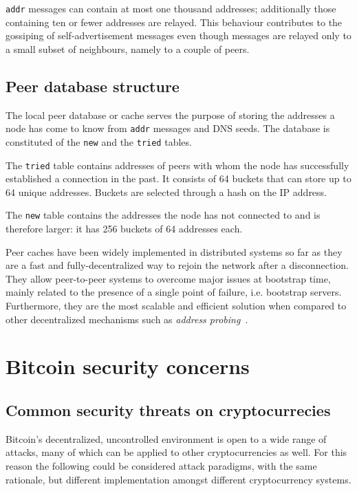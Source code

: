 \documentclass[12pt, letterpaper, twoside]{article}
\begin{document}
 \texttt{addr} messages can contain at most one thousand addresses; additionally those containing ten or fewer addresses are relayed. This behaviour contributes to the gossiping of self-advertisement messages even though messages are relayed only to a small subset of neighbours, namely to a couple of peers.

\subsection{Peer database structure}\label{sec:cachestruct}
The local peer database or cache serves the purpose of storing the addresses a node has come to know from \texttt{addr} messages and DNS seeds. The database is constituted of the \texttt{new} and the \texttt{tried} tables.

The \texttt{tried} table contains addresses of peers with whom the node has successfully established a connection in the past. It consists of 64 buckets that can store up to 64 unique addresses. Buckets are selected through a hash on the IP address.

The \texttt{new} table contains the addresses the node has not connected to and is therefore larger: it has 256 buckets of 64 addresses each.

Peer caches have been widely implemented in distributed systems so far as they are a fast and fully-decentralized way to rejoin the network after a disconnection. They allow peer-to-peer systems to overcome major issues at bootstrap time, mainly related to the presence of a single point of failure, i.e. bootstrap servers. Furthermore, they are the most scalable and efficient solution when compared to other decentralized mechanisms such as \textit{address probing}~\cite{decentrbootstrapp2p}.

\section{Bitcoin security concerns}\label{sec:securityintro}
\subsection{Common security threats on cryptocurrecies}
Bitcoin's decentralized, uncontrolled environment is open to a wide range of attacks, many of which can be applied to other cryptocurrencies as well. For this reason the following could be considered attack paradigms, with the same rationale, but different implementation amongst different cryptocurrency systems.
\end{document}
